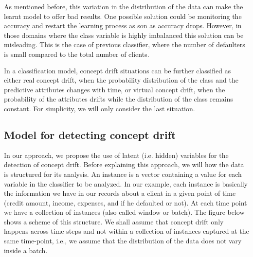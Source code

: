 \documentclass[10pt,a4paper]{article}
\begin{document}
As mentioned before, this variation in the distribution of the data can make the learnt model to offer bad results. One possible solution could be monitoring the accuracy and restart the learning process as son as accuracy drops. However, in those domains where the class variable is highly imbalanced this solution can be misleading. This is the case of previous classifier, where the number of defaulters is small compared to the total number of clients.

In a classification model, concept drift situations can be further classified as either real concept drift, when the probability distribution of the class and the predictive attributes changes with time, or virtual concept drift, when the probability of the attributes drifts while the distribution of the class remains constant. For simplicity, we will only consider the last situation.


\subsection{Model for detecting concept drift}\label{sec:blog_conceptdrift:model}


In our approach, we propose the use of latent (i.e. hidden) variables for the detection of concept drift. Before explaining this approach, we will how the data is structured for its analysis. An instance is a vector containing a value for each variable in the classifier to be analyzed. In our example, each instance is basically the information we have in our records about a client in a given point of time (credit amount, income, expenses, and if he defaulted or not). At each time point we have a collection of instances (also called window or batch). The figure below shows a scheme of this structure. We shall assume that concept drift only happens across time steps and not within a collection of instances captured at the same time-point, i.e., we assume that the distribution of the data does not vary inside a batch.
\end{document}
